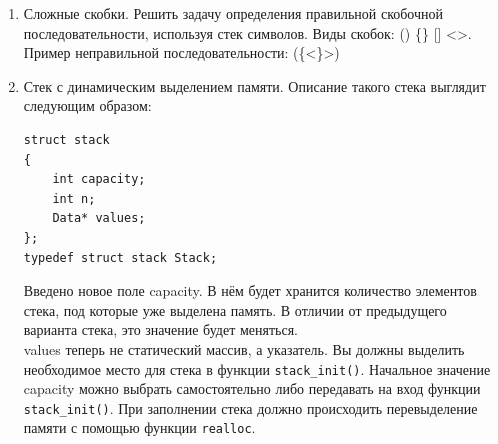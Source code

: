 \documentclass{article}
\begin{document}
\begin{enumerate}
\item Сложные скобки. Решить задачу определения правильной скобочной последовательности, используя стек символов. Виды скобок: () \{\} [] <>. Пример неправильной последовательности: (\{<\}>)
\item Стек с динамическим выделением памяти. Описание такого стека выглядит следующим образом:
\begin{verbatim}
struct stack
{
    int capacity;
    int n;
    Data* values;
};
typedef struct stack Stack;
\end{verbatim}
Введено новое поле capacity. В нём будет хранится количество элементов стека, под которые уже выделена память. В отличии от предыдущего варианта стека, это значение будет меняться. \\
values теперь не статический массив, а указатель. Вы должны выделить необходимое место для стека в функции \texttt{stack\_init()}. Начальное значение capacity можно выбрать самостоятельно либо передавать на вход функции \texttt{stack\_init()}. При заполнении стека должно происходить перевыделение памяти с помощью функции \texttt{realloc}.
\end{enumerate}
\end{document}
